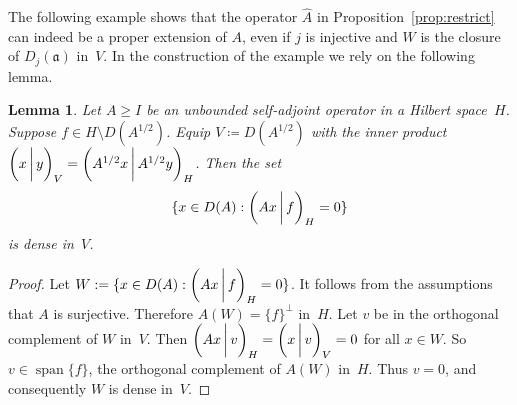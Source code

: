\documentclass[a4paper,oneside,12pt]{amsart}
\theoremstyle{plain}
\newtheorem{lemma}[theorem]{Lemma}
\theoremstyle{definition}
\let\ge=\geqslant
\begin{document}
The following example shows that the operator $\widehat{A}$ in Proposition~\ref{prop:restrict}
can indeed be a proper extension of $A$, even if $j$ is injective and $W$ is the closure of $D_j({{\mathfrak{{a}}}})$ in~$V$.
In the construction of the example we rely on the following lemma.
\begin{lemma}\label{lem:op-dense-restrict}
Let $A\ge I$ be an unbounded self-adjoint operator in a Hilbert space~$H$.
Suppose $f\in H\setminus D(A^{1/2})$.
Equip $V\coloneqq D(A^{1/2})$ with the inner product ${{\ifthenelse{\equal{auto}{auto}}{\left({x}\mkern3mu{\biggm|}\mkern3mu {y}\right)}{}
\ifthenelse{\equal{auto}{b}}{\bigl({x}\mkern3mu{\biggm|}\mkern3mu {y}\bigr)}{}
\ifthenelse{\equal{auto}{B}}{\Bigl({x}\mkern3mu{\bigm|}\mkern3mu {y}\Bigr)}{}
}}_V={{\ifthenelse{\equal{auto}{auto}}{\left({A^{1/2}x}\mkern3mu{\biggm|}\mkern3mu {A^{1/2}y}\right)}{}
\ifthenelse{\equal{auto}{b}}{\bigl({A^{1/2}x}\mkern3mu{\biggm|}\mkern3mu {A^{1/2}y}\bigr)}{}
\ifthenelse{\equal{auto}{B}}{\Bigl({A^{1/2}x}\mkern3mu{\bigm|}\mkern3mu {A^{1/2}y}\Bigr)}{}
}}_H$. 
Then the set
\[
    \{ x\in D(A): {{\ifthenelse{\equal{auto}{auto}}{\left({Ax}\mkern3mu{\biggm|}\mkern3mu {f}\right)}{}
\ifthenelse{\equal{auto}{b}}{\bigl({Ax}\mkern3mu{\biggm|}\mkern3mu {f}\bigr)}{}
\ifthenelse{\equal{auto}{B}}{\Bigl({Ax}\mkern3mu{\bigm|}\mkern3mu {f}\Bigr)}{}
}}_H=0 \}
\]
is dense in~$V$.
\end{lemma}
\begin{proof}
Let $W := \{ x\in D(A): {{\ifthenelse{\equal{auto}{auto}}{\left({Ax}\mkern3mu{\biggm|}\mkern3mu {f}\right)}{}
\ifthenelse{\equal{auto}{b}}{\bigl({Ax}\mkern3mu{\biggm|}\mkern3mu {f}\bigr)}{}
\ifthenelse{\equal{auto}{B}}{\Bigl({Ax}\mkern3mu{\bigm|}\mkern3mu {f}\Bigr)}{}
}}_H=0 \}$.
It follows from the assumptions that $A$ is surjective. Therefore $A(W)=\{f\}^\perp$ in~$H$.
Let $v$ be in the orthogonal complement of $W$ in~$V$. Then
${{\ifthenelse{\equal{auto}{auto}}{\left({Ax}\mkern3mu{\biggm|}\mkern3mu {v}\right)}{}
\ifthenelse{\equal{auto}{b}}{\bigl({Ax}\mkern3mu{\biggm|}\mkern3mu {v}\bigr)}{}
\ifthenelse{\equal{auto}{B}}{\Bigl({Ax}\mkern3mu{\bigm|}\mkern3mu {v}\Bigr)}{}
}}_H = {{\ifthenelse{\equal{auto}{auto}}{\left({x}\mkern3mu{\biggm|}\mkern3mu {v}\right)}{}
\ifthenelse{\equal{auto}{b}}{\bigl({x}\mkern3mu{\biggm|}\mkern3mu {v}\bigr)}{}
\ifthenelse{\equal{auto}{B}}{\Bigl({x}\mkern3mu{\bigm|}\mkern3mu {v}\Bigr)}{}
}}_V = 0$
for all $x\in W$. So $v\in \operatorname{span}\{f\}$, the orthogonal complement of $A(W)$ in~$H$.
Thus $v=0$, and consequently $W$ is dense in~$V$.
\end{proof}
\end{document}
